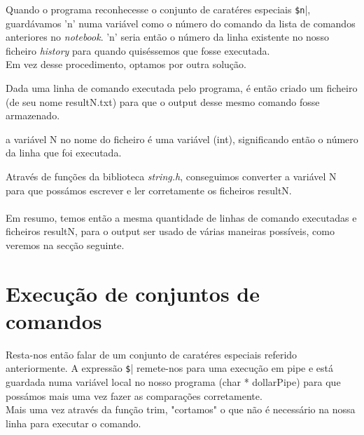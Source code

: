\documentclass[11pt,a4paper]{report}
\begin{document}
Quando o programa reconhecesse o conjunto de caratéres especiais \verb|$n||, guardávamos 'n' numa variável como o número do comando da lista de comandos anteriores no \textit{notebook}. 'n' seria então o número da linha existente no nosso ficheiro \textit{history} para quando quiséssemos que fosse executada.
~\\

Em vez desse procedimento, optamos por outra solução.

Dada uma linha de comando executada pelo programa, é então criado um ficheiro (de seu nome resultN.txt) para que o output desse mesmo comando fosse armazenado.

a variável N no nome do ficheiro é uma variável (int), significando então o número da linha que foi executada.

Através de funções da biblioteca \textit{string.h}, conseguimos converter a variável N para que possámos escrever e ler corretamente os ficheiros resultN.
~\\


 ~\\

Em resumo, temos então a mesma quantidade de linhas de comando executadas e ficheiros resultN, para o output ser usado de várias maneiras possíveis, como veremos na secção seguinte. 
\pagebreak
\section{Execução de conjuntos de comandos}

Resta-nos então falar de um conjunto de caratéres especiais referido anteriormente. A expressão \verb|$|| remete-nos para uma execução em pipe e está guardada numa variável local no nosso programa (char * dollarPipe) para que possámos mais uma vez fazer as comparações corretamente.
~\\
 

Mais uma vez através da função trim, "cortamos" o que não é necessário na nossa linha para executar o comando.
 ~\\
\end{document}

